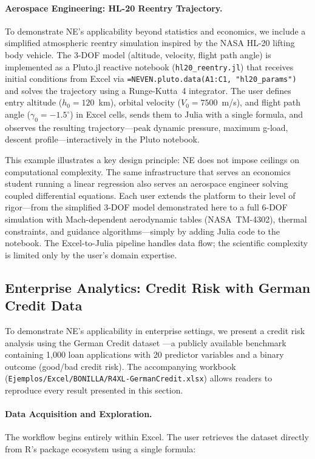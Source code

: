 \documentclass[preprint,12pt,authoryear]{elsarticle}
\newcommand{\neven}{NE\raisebox{0.2ex}{v}\rotatebox[origin=c]{180}{E}\rotatebox[origin=c]{180}{N}}
\begin{document}
\paragraph{Aerospace Engineering: HL-20 Reentry Trajectory.}
To demonstrate \neven{}'s applicability beyond statistics and economics, we include a simplified atmospheric reentry simulation inspired by the NASA HL-20 lifting body vehicle. The 3-DOF model (altitude, velocity, flight path angle) is implemented as a Pluto.jl reactive notebook (\texttt{hl20\_reentry.jl}) that receives initial conditions from Excel via \texttt{=NEVEN.pluto.data(A1:C1, "hl20\_params")} and solves the trajectory using a Runge-Kutta~4 integrator. The user defines entry altitude ($h_0 = 120$~km), orbital velocity ($V_0 = 7500$~m/s), and flight path angle ($\gamma_0 = -1.5^\circ$) in Excel cells, sends them to Julia with a single formula, and observes the resulting trajectory---peak dynamic pressure, maximum g-load, descent profile---interactively in the Pluto notebook.

This example illustrates a key design principle: \neven{} does not impose ceilings on computational complexity. The same infrastructure that serves an economics student running a linear regression also serves an aerospace engineer solving coupled differential equations. Each user extends the platform to their level of rigor---from the simplified 3-DOF model demonstrated here to a full 6-DOF simulation with Mach-dependent aerodynamic tables (NASA~TM-4302), thermal constraints, and guidance algorithms---simply by adding Julia code to the notebook. The Excel-to-Julia pipeline handles data flow; the scientific complexity is limited only by the user's domain expertise.

\subsection{Enterprise Analytics: Credit Risk with German Credit Data}
\label{subsec:enterprise}

To demonstrate \neven{}'s applicability in enterprise settings, we present a credit risk analysis using the German Credit dataset \citep{Dua2019}---a publicly available benchmark containing 1,000 loan applications with 20 predictor variables and a binary outcome (good/bad credit risk). The accompanying workbook (\texttt{Ejemplos/Excel/BONILLA/R4XL-GermanCredit.xlsx}) allows readers to reproduce every result presented in this section.

\paragraph{Data Acquisition and Exploration.}
The workflow begins entirely within Excel. The user retrieves the dataset directly from R's package ecosystem using a single formula:
\end{document}
